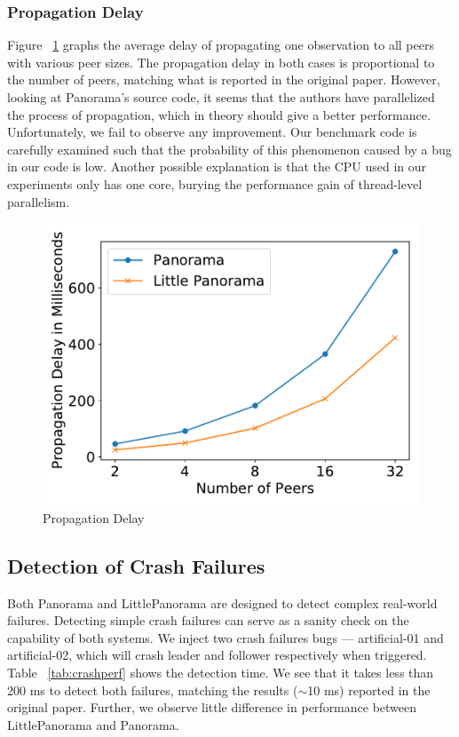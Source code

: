 \subsubsection{Propagation Delay} Figure ~\ref{fig:propagation} graphs the average delay of propagating one observation to all peers with various peer sizes. The propagation delay in both cases is proportional to the number of peers, matching what is reported in the original paper. However, looking at Panorama's source code, it seems that the authors have parallelized the process of propagation, which in theory should give a better performance. Unfortunately, we fail to observe any improvement. Our benchmark code is carefully examined such that the probability of this phenomenon caused by a bug in our code is low. Another possible explanation is that the CPU used in our experiments only has one core, burying the performance gain of thread-level parallelism.

\begin{figure}[!tb]
\centering
\includegraphics[scale=0.4]{figs/propagation.pdf}
\vspace{-1em}
\caption{Propagation Delay
\label{fig:propagation}
}
\end{figure}

\subsection{Detection of Crash Failures}
Both Panorama and LittlePanorama are designed to detect complex real-world failures. Detecting simple crash failures can serve as a sanity check on the capability of both systems. We inject two crash failures bugs --- artificial-01 and artificial-02, which will crash leader and follower respectively when triggered. Table ~\ref{tab:crashperf} shows the detection time. We see that it takes less than 200 ms to detect both failures, matching the results ($\sim$10 ms) reported in the original paper. Further, we observe little difference in performance between LittlePanorama and Panorama.

